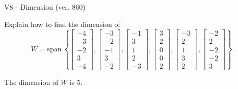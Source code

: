 \begin{exercise}
  \begin{exerciseTitle}V8 - Dimension (ver. 860)\end{exerciseTitle}
  \begin{exerciseStatement}
    Explain how to find the dimension of 
\[W=\mathrm{span}\ \left\{\left[\begin{array}{r}
-4 \\
-3 \\
-2 \\
3 \\
-4
\end{array}\right] , \left[\begin{array}{r}
-3 \\
-2 \\
-1 \\
3 \\
-2
\end{array}\right] , \left[\begin{array}{r}
-1 \\
3 \\
1 \\
2 \\
-3
\end{array}\right] , \left[\begin{array}{r}
3 \\
2 \\
0 \\
0 \\
2
\end{array}\right] , \left[\begin{array}{r}
-3 \\
2 \\
1 \\
3 \\
2
\end{array}\right] , \left[\begin{array}{r}
-2 \\
2 \\
-2 \\
-2 \\
3
\end{array}\right]\right\}.\]



  \end{exerciseStatement}
  \begin{exerciseAnswer}
   The dimension of \(W\) is  \(5\).
  


  \end{exerciseAnswer}
\end{exercise}